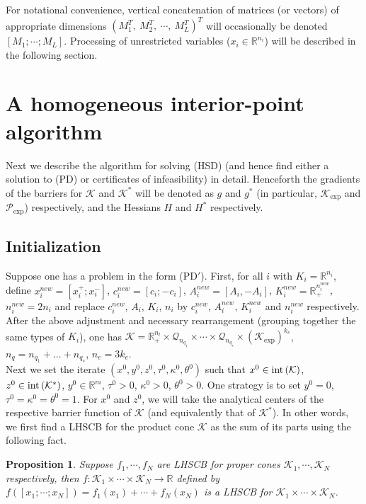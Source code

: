\documentclass[11pt]{article}
\theoremstyle{definition}
\theoremstyle{plain}
\newtheorem{prop}{Proposition}
\def\interior{\protect{\textnormal{int}}}
\begin{document}
For notational convenience, vertical concatenation of matrices (or vectors) of appropriate dimensions $(M_1^T,\ M_2^T,\ \cdots,\ M_L^T)^T$ will occasionally be denoted $[M_1; \cdots ; M_L]$. Processing of unrestricted variables ($x_i \in \mathbb{R}^{n_i}$) will be described in the following section.

\section{A homogeneous interior-point algorithm}
Next we describe the algorithm for solving (HSD) (and hence find either a solution to (PD) or certificates of infeasibility) in detail. Henceforth the gradients of the barriers for $\mathcal{K}$ and $\mathcal{K}^*$ will be denoted as $g$ and $g^*$ (in particular, $\mathcal{K}_{\exp}$ and $\mathcal{P}_{\exp}$) respectively, and the Hessians $H$ and $H^*$ respectively.
\subsection{Initialization}

Suppose one has a problem in the form (PD$'$). First, for all $i$ with $K_i = \mathbb{R}^{n_i}$, define $x_i^{new} = [x_i^+; x_i^-]$, $c_i^{new} = [c_i; -c_i]$, $A_i^{new} = [A_i, -A_i]$, $K_i^{new} = \mathbb{R}_+^{n_i^{new}}$, $n_i^{new} = 2n_i$ and replace $c_i^{new}$, $A_i$, $K_i$, $n_i$ by $c_i^{new}$, $A_i^{new}$, $K_i^{new}$ and $n_i^{new}$ respectively. After the above adjustment and necessary rearrangement (grouping together the same types of $K_i$), one has $\mathcal{K} = \mathbb{R}_+^{n_l} \times \mathcal{Q}_{n_{q_1}} \times \cdots \times \mathcal{Q}_{n_{q_s}} \times \left(\mathcal{K}_{\exp}\right)^{k_e}$, $n_q = n_{q_1} + ... + n_{q_s}$, $n_e = 3k_e$. \\

Next we set the iterate $(x^0,y^0, z^0, \tau^0, \kappa^0, \theta^0)$ such that $x^0 \in \interior\left(\mathcal{K}\right)$, $z^0 \in \interior\left(\mathcal{K}^*\right)$, $y^0 \in \mathbb{R}^m$, $\tau^0 > 0$, $\kappa^0 > 0$, $\theta^0>0$. One strategy is to set $y^0 = 0$, $\tau^0 = \kappa^0 = \theta^0 = 1$. For $x^0$ and $z^0$, we will take the analytical centers of the respective barrier function of $\mathcal{K}$ (and equivalently that of $\mathcal{K}^*$). In other words, we first find a LHSCB for the product cone $\mathcal{K}$ as the sum of its parts using the following fact.
\begin{prop}
	Suppose $f_1, \cdots , f_N$ are LHSCB for proper cones $\mathcal{K}_1, \cdots, \mathcal{K}_N$ respectively, then $f: \mathcal{K}_1 \times\cdots\times \mathcal{K}_N \rightarrow \mathbb{R}$ defined by $f([x_1;\cdots; x_N]) = f_1(x_1) + \cdots + f_N(x_N)$ is a LHSCB for $\mathcal{K}_1 \times \cdots \times \mathcal{K}_N$.
\end{prop}
\end{document}
